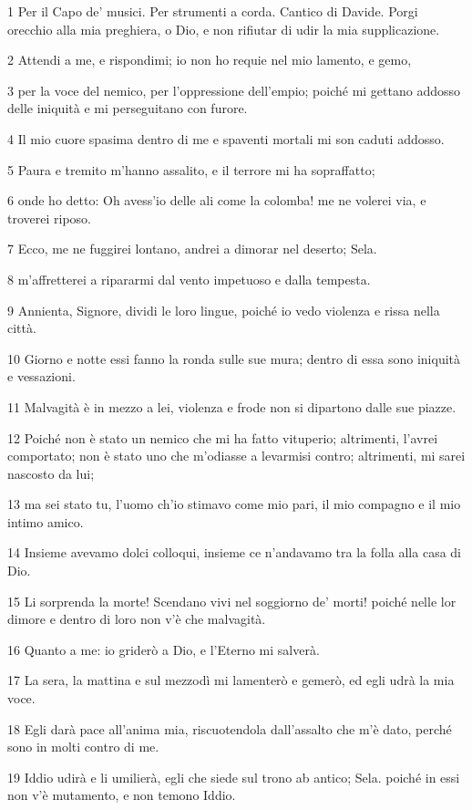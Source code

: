 \par 1 Per il Capo de' musici. Per strumenti a corda. Cantico di Davide. Porgi orecchio alla mia preghiera, o Dio, e non rifiutar di udir la mia supplicazione.
\par 2 Attendi a me, e rispondimi; io non ho requie nel mio lamento, e gemo,
\par 3 per la voce del nemico, per l'oppressione dell'empio; poiché mi gettano addosso delle iniquità e mi perseguitano con furore.
\par 4 Il mio cuore spasima dentro di me e spaventi mortali mi son caduti addosso.
\par 5 Paura e tremito m'hanno assalito, e il terrore mi ha sopraffatto;
\par 6 onde ho detto: Oh avess'io delle ali come la colomba! me ne volerei via, e troverei riposo.
\par 7 Ecco, me ne fuggirei lontano, andrei a dimorar nel deserto; Sela.
\par 8 m'affretterei a ripararmi dal vento impetuoso e dalla tempesta.
\par 9 Annienta, Signore, dividi le loro lingue, poiché io vedo violenza e rissa nella città.
\par 10 Giorno e notte essi fanno la ronda sulle sue mura; dentro di essa sono iniquità e vessazioni.
\par 11 Malvagità è in mezzo a lei, violenza e frode non si dipartono dalle sue piazze.
\par 12 Poiché non è stato un nemico che mi ha fatto vituperio; altrimenti, l'avrei comportato; non è stato uno che m'odiasse a levarmisi contro; altrimenti, mi sarei nascosto da lui;
\par 13 ma sei stato tu, l'uomo ch'io stimavo come mio pari, il mio compagno e il mio intimo amico.
\par 14 Insieme avevamo dolci colloqui, insieme ce n'andavamo tra la folla alla casa di Dio.
\par 15 Li sorprenda la morte! Scendano vivi nel soggiorno de' morti! poiché nelle lor dimore e dentro di loro non v'è che malvagità.
\par 16 Quanto a me: io griderò a Dio, e l'Eterno mi salverà.
\par 17 La sera, la mattina e sul mezzodì mi lamenterò e gemerò, ed egli udrà la mia voce.
\par 18 Egli darà pace all'anima mia, riscuotendola dall'assalto che m'è dato, perché sono in molti contro di me.
\par 19 Iddio udirà e li umilierà, egli che siede sul trono ab antico; Sela. poiché in essi non v'è mutamento, e non temono Iddio.

